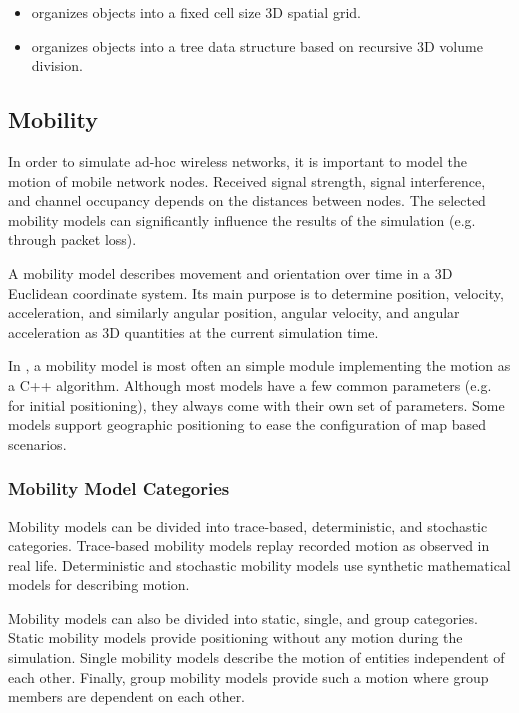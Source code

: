 \begin{itemize}
        \item {} organizes objects into a fixed cell size 3D spatial grid.
        \item {} organizes objects into a tree data structure based on recursive 3D volume division.
\end{itemize}

\subsection{Mobility}
\label{subsec:mobility}
In order to simulate ad-hoc wireless networks, it is important to model the motion of mobile network nodes. Received signal strength, signal interference, and channel occupancy depends on the distances between nodes. The selected mobility models can significantly influence the results of the simulation (e.g. through packet loss).

A mobility model describes movement and orientation over time in a 3D Euclidean coordinate system. Its main purpose is to determine position, velocity, acceleration, and similarly angular position, angular velocity, and angular acceleration as 3D quantities at the current simulation time.

In \inet, a mobility model is most often an \omnet simple module implementing the motion as a C++ algorithm. Although most models have a few common parameters (e.g. for initial positioning), they always come with their own set of parameters. Some models support geographic positioning to ease the configuration of map based scenarios.

\subsubsection*{Mobility Model Categories}
Mobility models can be divided into trace-based, deterministic, and stochastic categories. Trace-based mobility models replay recorded motion as observed in real life. Deterministic and stochastic mobility models use synthetic mathematical models for describing motion.

Mobility models can also be divided into static, single, and group categories. Static mobility models provide positioning without any motion during the simulation. Single mobility models describe the motion of entities independent of each other. Finally, group mobility models provide such a motion where group members are dependent on each other.

